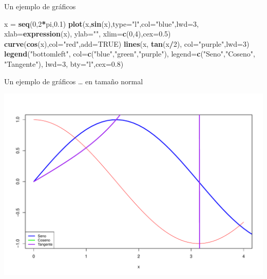 \documentclass[
  ignorenonframetext,
]{beamer}
\newenvironment{Shaded}{\begin{snugshade}}{\end{snugshade}}
\newcommand{\AttributeTok}[1]{\textcolor[rgb]{0.13,0.29,0.53}{#1}}
\newcommand{\ConstantTok}[1]{\textcolor[rgb]{0.56,0.35,0.01}{#1}}
\newcommand{\DecValTok}[1]{\textcolor[rgb]{0.00,0.00,0.81}{#1}}
\newcommand{\FloatTok}[1]{\textcolor[rgb]{0.00,0.00,0.81}{#1}}
\newcommand{\FunctionTok}[1]{\textcolor[rgb]{0.13,0.29,0.53}{\textbf{#1}}}
\newcommand{\NormalTok}[1]{#1}
\newcommand{\OtherTok}[1]{\textcolor[rgb]{0.56,0.35,0.01}{#1}}
\newcommand{\SpecialCharTok}[1]{\textcolor[rgb]{0.81,0.36,0.00}{\textbf{#1}}}
\newcommand{\StringTok}[1]{\textcolor[rgb]{0.31,0.60,0.02}{#1}}
\begin{document}
\begin{frame}[fragile]{Un ejemplo de gráficos}
\label{un-ejemplo-de-gruxe1ficos}
\begin{Shaded}
\begin{Highlighting}[]
\NormalTok{x }\OtherTok{=} \FunctionTok{seq}\NormalTok{(}\DecValTok{0}\NormalTok{,}\DecValTok{2}\SpecialCharTok{*}\NormalTok{pi,}\FloatTok{0.1}\NormalTok{)}
\FunctionTok{plot}\NormalTok{(x,}\FunctionTok{sin}\NormalTok{(x),}\AttributeTok{type=}\StringTok{"l"}\NormalTok{,}\AttributeTok{col=}\StringTok{"blue"}\NormalTok{,}\AttributeTok{lwd=}\DecValTok{3}\NormalTok{, }
     \AttributeTok{xlab=}\FunctionTok{expression}\NormalTok{(x), }\AttributeTok{ylab=}\StringTok{""}\NormalTok{,}
     \AttributeTok{xlim=}\FunctionTok{c}\NormalTok{(}\DecValTok{0}\NormalTok{,}\DecValTok{4}\NormalTok{),}\AttributeTok{cex=}\FloatTok{0.5}\NormalTok{)}
\FunctionTok{curve}\NormalTok{(}\FunctionTok{cos}\NormalTok{(x),}\AttributeTok{col=}\StringTok{"red"}\NormalTok{,}\AttributeTok{add=}\ConstantTok{TRUE}\NormalTok{)}
\FunctionTok{lines}\NormalTok{(x, }\FunctionTok{tan}\NormalTok{(x}\SpecialCharTok{/}\DecValTok{2}\NormalTok{), }\AttributeTok{col=}\StringTok{"purple"}\NormalTok{,}\AttributeTok{lwd=}\DecValTok{3}\NormalTok{)}
\FunctionTok{legend}\NormalTok{(}\StringTok{"bottomleft"}\NormalTok{,}
       \AttributeTok{col=}\FunctionTok{c}\NormalTok{(}\StringTok{"blue"}\NormalTok{,}\StringTok{"green"}\NormalTok{,}\StringTok{"purple"}\NormalTok{),}
       \AttributeTok{legend=}\FunctionTok{c}\NormalTok{(}\StringTok{"Seno"}\NormalTok{,}\StringTok{"Coseno"}\NormalTok{, }\StringTok{"Tangente"}\NormalTok{),}
       \AttributeTok{lwd=}\DecValTok{3}\NormalTok{, }\AttributeTok{bty=}\StringTok{"l"}\NormalTok{,}\AttributeTok{cex=}\FloatTok{0.8}\NormalTok{)}
\end{Highlighting}
\end{Shaded}
\end{frame}

\begin{frame}{Un ejemplo de gráficos}
\label{un-ejemplo-de-gruxe1ficos-1}
\ldots{} en tamaño normal

\begin{center}\includegraphics[width=0.8\linewidth]{R_base_files/figure-beamer/plot2_tema1-1} \end{center}
\end{frame}
\end{document}
